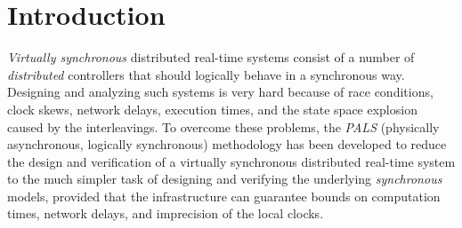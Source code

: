 

\section{Introduction}

\emph{Virtually synchronous} distributed real-time systems consist of
a number of \emph{distributed} controllers that should logically
behave in a synchronous way. %
Designing and analyzing  such systems is very hard because
of race conditions, clock skews, network delays, execution times, and
the state space explosion caused by the interleavings. To overcome
these problems, 
the \emph{PALS} (physically asynchronous, logically synchronous) methodology
\cite{pals-rtss09,mr-pals-journal,pals-tcs,al2012pattern} has been
developed to reduce the design and verification of a virtually
synchronous distributed real-time system to the much simpler task  of designing and
verifying the underlying \emph{synchronous} models,
provided that the  infrastructure can guarantee bounds
on computation times, network delays, and imprecision of the local clocks.






